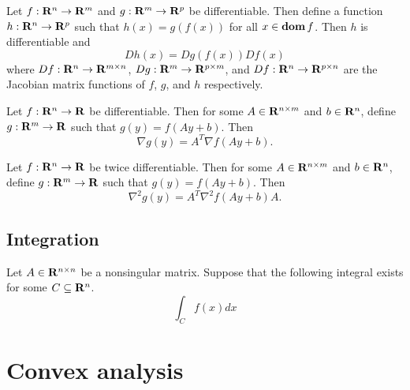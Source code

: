 \documentclass[10pt, twoside]{book}   	%
\begin{document}
\begin{corollary}
\label{corollary:chain-rule-gen}
Let $f:\mathbf{R}^n\to\mathbf{R}^m$ and $g:\mathbf{R}^m\to\mathbf{R}^p$ be differentiable.
Then define a function $h:\mathbf{R}^n\to\mathbf{R}^p$ such that $h(x) = g(f(x))$ for all $x\in\mathop{\bf dom} f$.
Then $h$ is differentiable and
\begin{equation}
\label{eq:chain-rule-gen}
D h(x) = Dg(f(x)) Df(x)
\end{equation}
where
$D f:\mathbf{R}^n\to\mathbf{R}^{m\times n}$,
$D g:\mathbf{R}^m\to\mathbf{R}^{p\times m}$,
and $D f:\mathbf{R}^n\to\mathbf{R}^{p\times n}$
are the Jacobian matrix functions of $f$, $g$, and $h$ respectively.
\end{corollary}

\begin{corollary}
\label{corollary:dixu}
Let $f:\mathbf{R}^n\to\mathbf{R}$ be differentiable.
Then for some $A\in\mathbf{R}^{n\times m}$ and $b\in\mathbf{R}^n$,
define $g:\mathbf{R}^m\to\mathbf{R}$ such that $g(y) = f(Ay+b)$.
Then
\begin{equation}
\label{eq:dixu}
\nabla g(y) = A^T \nabla f(Ay+b).
\end{equation}
\end{corollary}


\begin{corollary}
\label{corollary:eicg}
Let $f:\mathbf{R}^n\to\mathbf{R}$ be twice differentiable.
Then for some $A\in\mathbf{R}^{n\times m}$ and $b\in\mathbf{R}^n$,
define $g:\mathbf{R}^m\to\mathbf{R}$ such that $g(y) = f(Ay+b)$.
Then
\begin{equation}
\label{eq:eicg}
\nabla^2 g(y) = A^T \nabla^2 f(Ay+b)A.
\end{equation}
\end{corollary}

\section{Integration}


\begin{lemma}
Let $A\in\mathbf{R}^{n\times n}$ be a nonsingular matrix. Suppose that the following integral exists for some $C\subseteq \mathbf{R}^n$.
\begin{equation}
\int_{C} f(x) dx
\end{equation}
\end{lemma}





\chapter{Convex analysis}
\end{document}
